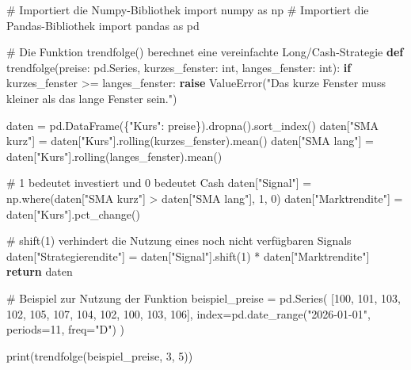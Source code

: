 \documentclass[
  ngerman,
  a4paper,
  DIV=11,
  oneside]{scrreprt}
\newenvironment{Shaded}{\begin{snugshade}}{\end{snugshade}}
\newcommand{\BuiltInTok}[1]{\textcolor[rgb]{0.00,0.23,0.31}{#1}}
\newcommand{\CommentTok}[1]{\textcolor[rgb]{0.37,0.37,0.37}{#1}}
\newcommand{\ControlFlowTok}[1]{\textcolor[rgb]{0.00,0.23,0.31}{\textbf{#1}}}
\newcommand{\DecValTok}[1]{\textcolor[rgb]{0.68,0.00,0.00}{#1}}
\newcommand{\ImportTok}[1]{\textcolor[rgb]{0.00,0.46,0.62}{#1}}
\newcommand{\KeywordTok}[1]{\textcolor[rgb]{0.00,0.23,0.31}{\textbf{#1}}}
\newcommand{\NormalTok}[1]{\textcolor[rgb]{0.00,0.23,0.31}{#1}}
\newcommand{\OperatorTok}[1]{\textcolor[rgb]{0.37,0.37,0.37}{#1}}
\newcommand{\PreprocessorTok}[1]{\textcolor[rgb]{0.68,0.00,0.00}{#1}}
\newcommand{\StringTok}[1]{\textcolor[rgb]{0.13,0.47,0.30}{#1}}
\begin{document}
\begin{Shaded}
\begin{Highlighting}[]
\CommentTok{\# Importiert die Numpy{-}Bibliothek}
\ImportTok{import}\NormalTok{ numpy }\ImportTok{as}\NormalTok{ np}
\CommentTok{\# Importiert die Pandas{-}Bibliothek}
\ImportTok{import}\NormalTok{ pandas }\ImportTok{as}\NormalTok{ pd}

\CommentTok{\# Die Funktion trendfolge() berechnet eine vereinfachte Long/Cash{-}Strategie}
\KeywordTok{def}\NormalTok{ trendfolge(preise: pd.Series, kurzes\_fenster: }\BuiltInTok{int}\NormalTok{, langes\_fenster: }\BuiltInTok{int}\NormalTok{):}
    \ControlFlowTok{if}\NormalTok{ kurzes\_fenster }\OperatorTok{\textgreater{}=}\NormalTok{ langes\_fenster:}
        \ControlFlowTok{raise} \PreprocessorTok{ValueError}\NormalTok{(}\StringTok{"Das kurze Fenster muss kleiner als das lange Fenster sein."}\NormalTok{)}
    
\NormalTok{    daten }\OperatorTok{=}\NormalTok{ pd.DataFrame(\{}\StringTok{"Kurs"}\NormalTok{: preise\}).dropna().sort\_index()}
\NormalTok{    daten[}\StringTok{"SMA kurz"}\NormalTok{] }\OperatorTok{=}\NormalTok{ daten[}\StringTok{"Kurs"}\NormalTok{].rolling(kurzes\_fenster).mean()}
\NormalTok{    daten[}\StringTok{"SMA lang"}\NormalTok{] }\OperatorTok{=}\NormalTok{ daten[}\StringTok{"Kurs"}\NormalTok{].rolling(langes\_fenster).mean()}
    
    \CommentTok{\# 1 bedeutet investiert und 0 bedeutet Cash}
\NormalTok{    daten[}\StringTok{"Signal"}\NormalTok{] }\OperatorTok{=}\NormalTok{ np.where(daten[}\StringTok{"SMA kurz"}\NormalTok{] }\OperatorTok{\textgreater{}}\NormalTok{ daten[}\StringTok{"SMA lang"}\NormalTok{], }\DecValTok{1}\NormalTok{, }\DecValTok{0}\NormalTok{)}
\NormalTok{    daten[}\StringTok{"Marktrendite"}\NormalTok{] }\OperatorTok{=}\NormalTok{ daten[}\StringTok{"Kurs"}\NormalTok{].pct\_change()}
    
    \CommentTok{\# shift(1) verhindert die Nutzung eines noch nicht verfügbaren Signals}
\NormalTok{    daten[}\StringTok{"Strategierendite"}\NormalTok{] }\OperatorTok{=}\NormalTok{ daten[}\StringTok{"Signal"}\NormalTok{].shift(}\DecValTok{1}\NormalTok{) }\OperatorTok{*}\NormalTok{ daten[}\StringTok{"Marktrendite"}\NormalTok{]}
    \ControlFlowTok{return}\NormalTok{ daten}

\CommentTok{\# Beispiel zur Nutzung der Funktion}
\NormalTok{beispiel\_preise }\OperatorTok{=}\NormalTok{ pd.Series(}
\NormalTok{    [}\DecValTok{100}\NormalTok{, }\DecValTok{101}\NormalTok{, }\DecValTok{103}\NormalTok{, }\DecValTok{102}\NormalTok{, }\DecValTok{105}\NormalTok{, }\DecValTok{107}\NormalTok{, }\DecValTok{104}\NormalTok{, }\DecValTok{102}\NormalTok{, }\DecValTok{100}\NormalTok{, }\DecValTok{103}\NormalTok{, }\DecValTok{106}\NormalTok{],}
\NormalTok{    index}\OperatorTok{=}\NormalTok{pd.date\_range(}\StringTok{"2026{-}01{-}01"}\NormalTok{, periods}\OperatorTok{=}\DecValTok{11}\NormalTok{, freq}\OperatorTok{=}\StringTok{"D"}\NormalTok{)}
\NormalTok{)}

\BuiltInTok{print}\NormalTok{(trendfolge(beispiel\_preise, }\DecValTok{3}\NormalTok{, }\DecValTok{5}\NormalTok{))}
\end{Highlighting}
\end{Shaded}
\end{document}
